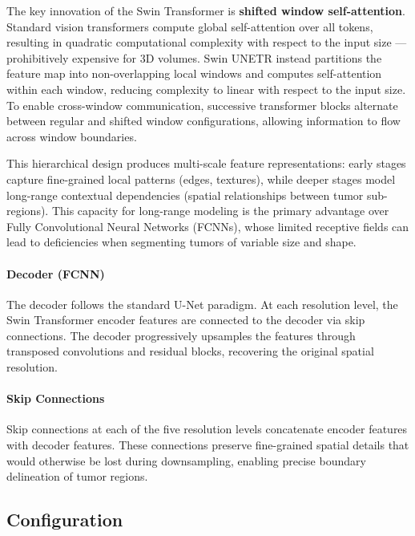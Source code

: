 \documentclass{article}
\begin{document}
The key innovation of the Swin Transformer is \textbf{shifted window self-attention}. Standard vision transformers compute global self-attention over all tokens, resulting in quadratic computational complexity with respect to the input size --- prohibitively expensive for 3D volumes. Swin UNETR instead partitions the feature map into non-overlapping local windows and computes self-attention within each window, reducing complexity to linear with respect to the input size. To enable cross-window communication, successive transformer blocks alternate between regular and shifted window configurations, allowing information to flow across window boundaries.

This hierarchical design produces multi-scale feature representations: early stages capture fine-grained local patterns (edges, textures), while deeper stages model long-range contextual dependencies (spatial relationships between tumor sub-regions). This capacity for long-range modeling is the primary advantage over Fully Convolutional Neural Networks (FCNNs), whose limited receptive fields can lead to deficiencies when segmenting tumors of variable size and shape.

\paragraph{Decoder (FCNN)} The decoder follows the standard U-Net paradigm. At each resolution level, the Swin Transformer encoder features are connected to the decoder via skip connections. The decoder progressively upsamples the features through transposed convolutions and residual blocks, recovering the original spatial resolution.

\paragraph{Skip Connections} Skip connections at each of the five resolution levels concatenate encoder features with decoder features. These connections preserve fine-grained spatial details that would otherwise be lost during downsampling, enabling precise boundary delineation of tumor regions.

\subsection{Configuration}
\end{document}
